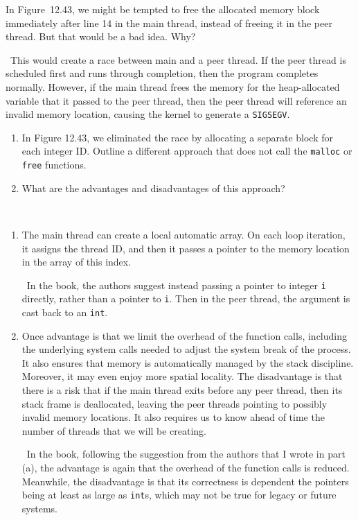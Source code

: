 \documentclass[12pt]{article}
\newenvironment{ex}[2][Exercise]{\begin{trivlist}
		\item[\hskip \labelsep {\bfseries #1}\hskip \labelsep {\bfseries #2.}]}{\end{trivlist}}
\newenvironment{sol}[1][Solution]{\begin{trivlist}
		\item[\hskip \labelsep {\bfseries #1:}]}{\end{trivlist}}
\begin{document}
\begin{ex}{12.13}
	In Figure~12.43, we might be tempted to free the allocated memory block immediately
	after line 14 in the main thread, instead of freeing it in the peer thread. But
	that would be a bad idea. Why?
\end{ex}

\begin{sol}
	\
	This would create a race between main and a peer thread. If the peer thread is scheduled
	first and runs through completion, then the program completes normally. However, if the
	main thread frees the memory for the heap-allocated variable that it passed to the peer
	thread, then the peer thread will reference an invalid memory location, causing the kernel
	to generate a \texttt{SIGSEGV}.
\end{sol}

\begin{ex}{12.14}
	\begin{enumerate}[label=(\alph*)]
		\item In Figure 12.43, we eliminated the race by allocating a separate block for each
		integer ID. Outline a different approach that does not call the \texttt{malloc} or
		\texttt{free} functions.
		\item What are the advantages and disadvantages of this approach?
	\end{enumerate}
\end{ex}

\begin{sol}
	\
	\begin{enumerate}[label=(\alph*)]
		\item The main thread can create a local automatic array.  On each loop iteration,
		it assigns the thread ID, and then it passes a pointer to the memory location in
		the array of this index.
		
		\
		In the book, the authors suggest instead passing a pointer to integer \texttt{i}
		directly, rather than a pointer to \texttt{i}. Then in the peer thread, the argument
		is cast back to an \texttt{int}.
		\item Once advantage is that we limit the overhead of the function calls, including
		the underlying system calls needed to adjust the system break of the process.
		It also ensures that memory is automatically managed by the stack discipline. Moreover,
		it may even enjoy more spatial locality. The disadvantage is that there is a risk that
		if the main thread exits before any peer thread, then its stack frame is deallocated,
		leaving the peer threads pointing to possibly invalid memory locations. It also
		requires us to know ahead of time the number of threads that we will be creating.
		
		\
		In the book, following the suggestion from the authors that I wrote in part (a), 
		the advantage is again that the overhead of the function calls is reduced. Meanwhile,
		the disadvantage is that its correctness is dependent the pointers being at least as large
		as \texttt{int}s, which may not be true for legacy or future systems.
	\end{enumerate}
\end{sol}
\end{document}
